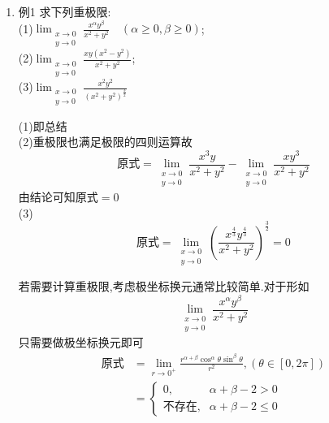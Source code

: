 \documentclass[12pt, a4paper, oneside, UTF8]{ctexbook}
\begin{document}
\begin{enumerate}[label=\arabic*.]
    \item 例1 求下列重极限: \\
        (1)$\displaystyle \lim_{\substack{x\to 0\\ y\to 0}}\frac{x^\alpha y^\beta}{x^2+y^2}\quad (\alpha\geq0,\beta\geq0)$; \\
        (2)$\displaystyle \lim_{\substack{x\to 0\\ y\to 0}}\frac{xy(x^{2}-y^{2})}{x^{2}+y^{2}}$; \\
        (3)$\displaystyle \lim_{\substack{x\to 0\\ y\to 0}}\frac{x^2y^2}{(x^2+y^2)^{\frac{3}{2}}}$
    
    \begin{solution}
    (1)即总结 \\
    (2)重极限也满足极限的四则运算故
    $$
    \text{原式}=\lim_{\substack{x\to 0\\y\to 0}}\frac{x^3y}{x^2+y^2}-\lim_{\substack{x\to 0\\y\to 0}}\frac{xy^3}{x^2+y^2} 
    $$
    由结论可知$\text{原式}=0$ \\
    (3)
    $$
    \text{原式}=\lim_{\substack{x\to 0\\y\to 0}}\left(\frac{x^{\frac{4}{3}}y^{\frac{4}{3}}}{x^2+y^2}\right)^{\frac{3}{2}} = 0
    $$
    \end{solution}
    
    \begin{tcolorbox}[title=求重极限的技巧]
    若需要计算重极限,考虑极坐标换元通常比较简单.对于形如
    $$
    \lim_{\substack{x\to 0\\ y\to 0}}\frac{x^{\alpha}y^{\beta}}{x^2+y^2} 
    $$
    只需要做极坐标换元即可
    \begin{align*}
        \text{原式} &= \lim_{r\to 0^{+}}
        \frac{r^{\alpha+\beta}\cos^{\alpha}{\theta}\sin^{\beta}{\theta}}{r^2},(\theta\in\left[0,2\pi\right]) \\
        &=\begin{cases}
            0, &\alpha + \beta - 2 > 0 \\
            \text{不存在}, &\alpha + \beta - 2 \leq 0
        \end{cases}
    \end{align*}
    \end{tcolorbox}


\end{enumerate}
\end{document}
